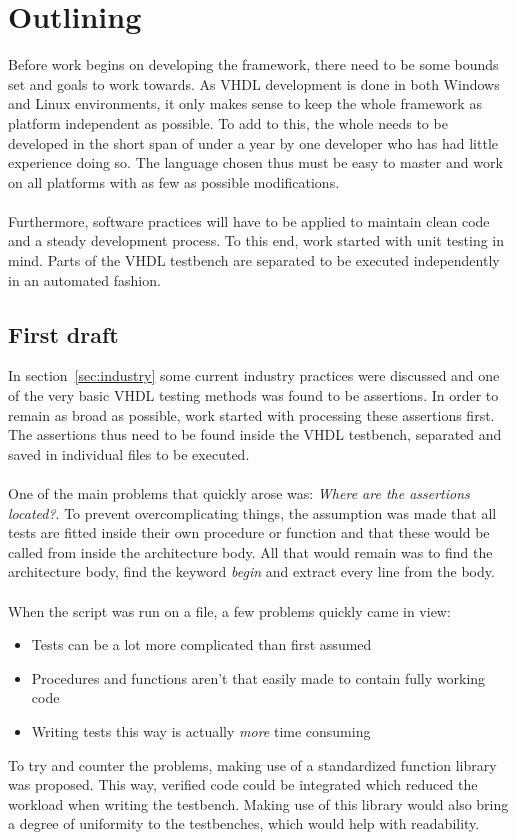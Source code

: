 \documentclass[11pt,british]{article}
\begin{document}
\section{Outlining}
Before work begins on developing the framework, there need to be some bounds set and goals to work towards. As VHDL development is done in both Windows and Linux environments, it only makes sense to keep the whole framework as platform independent as possible. To add to this, the whole needs to be developed in the short span of under a year by one developer who has had little experience doing so. The language chosen thus must be easy to master and work on all platforms with as few as possible modifications.\\
\\
Furthermore, software practices will have to be applied to maintain clean code and a steady development process. To this end, work started with unit testing in mind. Parts of the VHDL testbench are separated to be executed independently in an automated fashion.

\subsection{First draft}
In section~\ref{sec:industry} some current industry practices were discussed and one of the very basic VHDL testing methods was found to be assertions. In order to remain as broad as possible, work started with processing these assertions first. The assertions thus need to be found inside the VHDL testbench, separated and saved in individual files to be executed.\\
\\
One of the main problems that quickly arose was: \emph{Where are the assertions located?}. To prevent overcomplicating things, the assumption was made that all tests are fitted inside their own procedure or function and that these would be called from inside the architecture body. All that would remain was to find the architecture body, find the keyword \emph{begin} and extract every line from the body.\\
\\
When the script was run on a file, a few problems quickly came in view:
\begin{itemize}
\item Tests can be a lot more complicated than first assumed
\item Procedures and functions aren't that easily made to contain fully working code
\item Writing tests this way is actually \emph{more} time consuming
\end{itemize}
To try and counter the problems, making use of a standardized function library was proposed. This way, verified code could be integrated which reduced the workload when writing the testbench. Making use of this library would also bring a degree of uniformity to the testbenches, which would help with readability.
\end{document}
